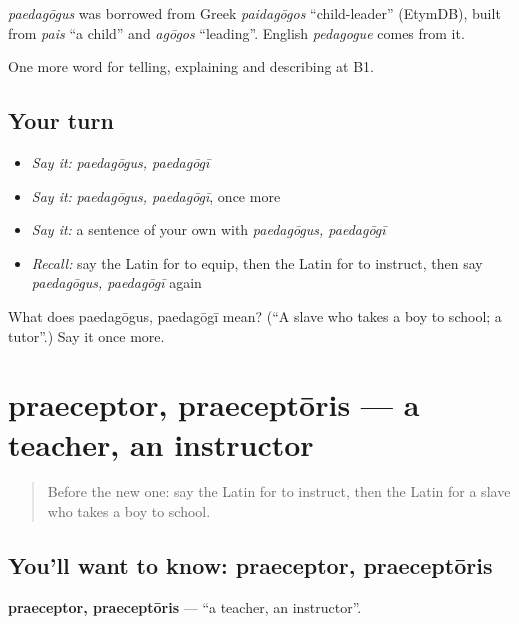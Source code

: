 \begin{cousinweb}
\emph{paedagōgus} was borrowed from Greek \emph{paidagōgos} \textquotedblleft{}child-leader\textquotedblright{} (EtymDB), built from \emph{pais} \textquotedblleft{}a child\textquotedblright{} and \emph{agōgos} \textquotedblleft{}leading\textquotedblright{}. English \emph{pedagogue} comes from it.
\end{cousinweb}

\begin{grammarlens}[title={What you've built}]
One more word for telling, explaining and describing at B1.
\end{grammarlens}

\subsection*{Your turn}
\begin{itemize}
\raggedright
  \item \emph{Say it:} \emph{paedagōgus, paedagōgī}
  \item \emph{Say it:} \emph{paedagōgus, paedagōgī}, once more
  \item \emph{Say it:} a sentence of your own with \emph{paedagōgus, paedagōgī}
  \item \emph{Recall:} say the Latin for to equip, then the Latin for to instruct, then say \emph{paedagōgus, paedagōgī} again
\end{itemize}

\begin{tcolorbox}[breakable,colback=teal!4,colframe=teal!35!black,title={Before you move on}]
What does paedagōgus, paedagōgī mean? (\textquotedblleft{}A slave who takes a boy to school; a tutor\textquotedblright{}.) Say it once more.
\end{tcolorbox}
\section[praeceptor, praeceptōris]{praeceptor, praeceptōris — a teacher, an instructor}

\label{lesson:LA-C401-praeceptor}



\begin{quote}
Before the new one: say the Latin for to instruct, then the Latin for a slave who takes a boy to school.
\end{quote}

\subsection*{You'll want to know: praeceptor, praeceptōris}
\textbf{praeceptor, praeceptōris} — \textquotedblleft{}a teacher, an instructor\textquotedblright{}.

